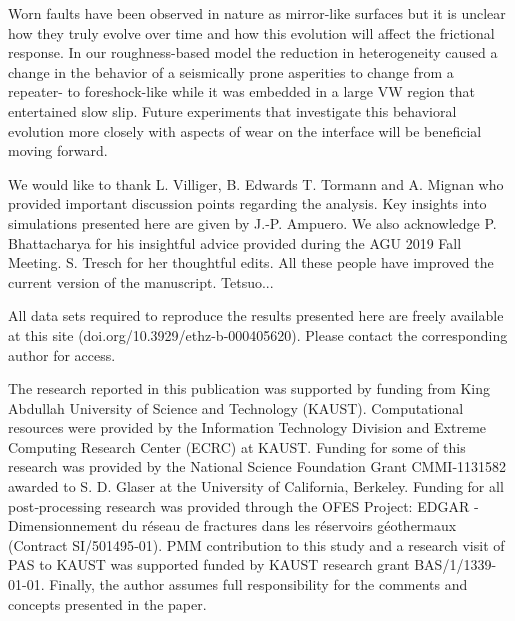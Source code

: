 \documentclass[final,3p, 11pt,authoryear]{elsarticle}
\begin{document}
Worn faults have been observed in nature as mirror-like surfaces but it is unclear how they truly evolve over time and how this evolution will affect the frictional response.  In our roughness-based model the reduction in heterogeneity caused a change in the behavior of a seismically prone asperities to change from a repeater- to foreshock-like while it was embedded in a large VW region that entertained slow slip.  Future experiments that investigate this behavioral evolution more closely with aspects of wear on the interface will be beneficial moving forward. 

\acknowledgments
We would like to thank L. Villiger, B. Edwards T. Tormann and A. Mignan who provided important discussion points regarding the analysis. Key insights into simulations presented here are given by J.-P. Ampuero. We also acknowledge P. Bhattacharya for his insightful advice provided during the AGU 2019 Fall Meeting.  S. Tresch for her thoughtful edits. All these people have improved the current version of the manuscript. Tetsuo...

All data sets required to reproduce the results presented here are freely available at this site (doi.org/10.3929/ethz-b-000405620). Please contact the corresponding author for access.

The research reported in this publication was supported by funding from King Abdullah University of Science and Technology (KAUST). Computational resources were provided by the Information Technology Division and Extreme Computing Research Center (ECRC) at KAUST.
Funding for some of this research was provided by the National Science Foundation Grant CMMI‐1131582 awarded to S. D. Glaser at the University of California, Berkeley. Funding for all post‐processing research was provided through the OFES Project: EDGAR ‐ Dimensionnement du réseau de fractures dans les réservoirs géothermaux (Contract SI/501495‐01). PMM contribution to this study and a research visit of PAS to KAUST was supported funded by KAUST research grant BAS/1/1339-01-01. Finally, the author assumes full responsibility for the comments and concepts presented in the paper.
 

\end{document}
